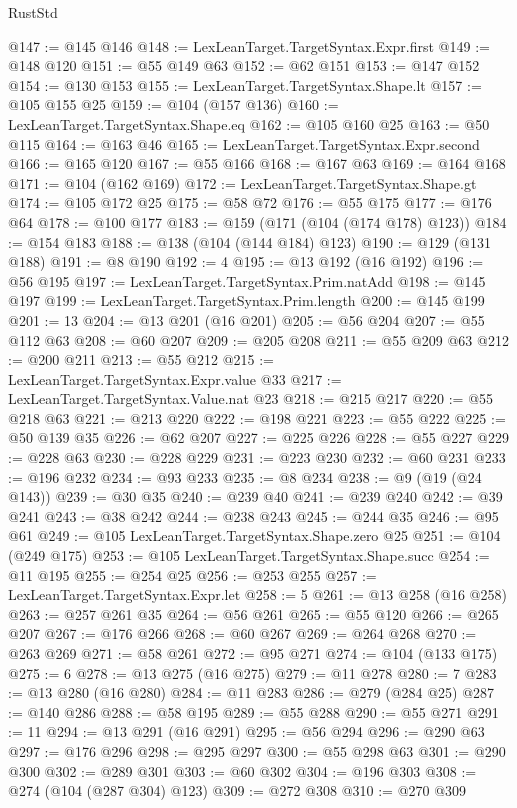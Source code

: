 \begin{lexlean}{RustStd}
\begin{coremodule}
{\begin{coremodule}
{{{{{{{{{{{{{{{{{{{{{{{{{{{{{{{{{{{@147 := @145 @146
@148 := LexLeanTarget.TargetSyntax.Expr.first
@149 := @148 @120
@151 := @55 @149 @63
@152 := @62 @151
@153 := @147 @152
@154 := @130 @153
@155 := LexLeanTarget.TargetSyntax.Shape.lt
@157 := @105 @155 @25
@159 := @104 (@157 @136)
@160 := LexLeanTarget.TargetSyntax.Shape.eq
@162 := @105 @160 @25
@163 := @50 @115
@164 := @163 @46
@165 := LexLeanTarget.TargetSyntax.Expr.second
@166 := @165 @120
@167 := @55 @166
@168 := @167 @63
@169 := @164 @168
@171 := @104 (@162 @169)
@172 := LexLeanTarget.TargetSyntax.Shape.gt
@174 := @105 @172 @25
@175 := @58 @72
@176 := @55 @175
@177 := @176 @64
@178 := @100 @177
@183 := @159 (@171 (@104 (@174 @178) @123))
@184 := @154 @183
@188 := @138 (@104 (@144 @184) @123)
@190 := @129 (@131 @188)
@191 := @8 @190
@192 := 4
@195 := @13 @192 (@16 @192)
@196 := @56 @195
@197 := LexLeanTarget.TargetSyntax.Prim.natAdd
@198 := @145 @197
@199 := LexLeanTarget.TargetSyntax.Prim.length
@200 := @145 @199
@201 := 13
@204 := @13 @201 (@16 @201)
@205 := @56 @204
@207 := @55 @112 @63
@208 := @60 @207
@209 := @205 @208
@211 := @55 @209 @63
@212 := @200 @211
@213 := @55 @212
@215 := LexLeanTarget.TargetSyntax.Expr.value @33
@217 := LexLeanTarget.TargetSyntax.Value.nat @23
@218 := @215 @217
@220 := @55 @218 @63
@221 := @213 @220
@222 := @198 @221
@223 := @55 @222
@225 := @50 @139 @35
@226 := @62 @207
@227 := @225 @226
@228 := @55 @227
@229 := @228 @63
@230 := @228 @229
@231 := @223 @230
@232 := @60 @231
@233 := @196 @232
@234 := @93 @233
@235 := @8 @234
@238 := @9 (@19 (@24 @143))
@239 := @30 @35
@240 := @239 @40
@241 := @239 @240
@242 := @39 @241
@243 := @38 @242
@244 := @238 @243
@245 := @244 @35
@246 := @95 @61
@249 := @105 LexLeanTarget.TargetSyntax.Shape.zero @25
@251 := @104 (@249 @175)
@253 := @105 LexLeanTarget.TargetSyntax.Shape.succ
@254 := @11 @195
@255 := @254 @25
@256 := @253 @255
@257 := LexLeanTarget.TargetSyntax.Expr.let
@258 := 5
@261 := @13 @258 (@16 @258)
@263 := @257 @261 @35
@264 := @56 @261
@265 := @55 @120
@266 := @265 @207
@267 := @176 @266
@268 := @60 @267
@269 := @264 @268
@270 := @263 @269
@271 := @58 @261
@272 := @95 @271
@274 := @104 (@133 @175)
@275 := 6
@278 := @13 @275 (@16 @275)
@279 := @11 @278
@280 := 7
@283 := @13 @280 (@16 @280)
@284 := @11 @283
@286 := @279 (@284 @25)
@287 := @140 @286
@288 := @58 @195
@289 := @55 @288
@290 := @55 @271
@291 := 11
@294 := @13 @291 (@16 @291)
@295 := @56 @294
@296 := @290 @63
@297 := @176 @296
@298 := @295 @297
@300 := @55 @298 @63
@301 := @290 @300
@302 := @289 @301
@303 := @60 @302
@304 := @196 @303
@308 := @274 (@104 (@287 @304) @123)
@309 := @272 @308
@310 := @270 @309
}}}}}}}}}}}}}}}}}}}}}}}}}}}}}}}}}}}
\end{coremodule}}
\end{coremodule}
\end{lexlean}
